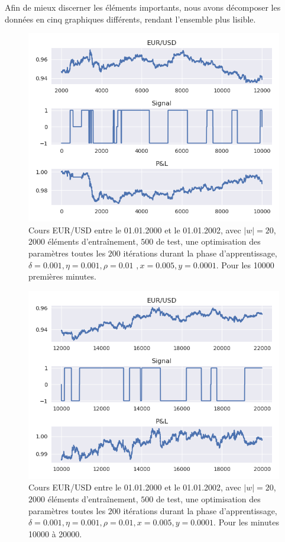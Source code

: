 \documentclass[a4paper, 11pt]{article}
\begin{document}
Afin de mieux discerner les éléments importants, nous avons décomposer les  données en cinq graphiques différents, rendant l'ensemble plus lisible.
 
 \begin{figure}[H]
\centering
\includegraphics[scale=0.85]{images/res/eursud_2000-2001_from_0to_10000}
\caption[Blup]{Cours EUR/USD entre le 01.01.2000 et le 01.01.2002, avec $|w| = 20$, $2000$ éléments d'entraînement, $500$ de test, une optimisation des
paramètres toutes les $200$ itérations durant la phase d'apprentissage, $\delta = 0.001, \eta=0.001,\rho=0.01$
\footnotemark$, x = 0.005, y=0.0001$. Pour les 10000 premières minutes.}
\end{figure}

 \begin{figure}[H]
\centering
\includegraphics[scale=0.85]{images/res/eursud_2000-2001_from_10000to_20000}
\caption[Blup]{Cours EUR/USD entre le 01.01.2000 et le 01.01.2002, avec $|w| = 20$, $2000$ éléments d'entraînement, $500$ de test, une optimisation des
	paramètres toutes les $200$ itérations durant la phase d'apprentissage, $\delta = 0.001, \eta=0.001,\rho=0.01, x = 0.005, y=0.0001$. Pour les minutes 10000 à 20000.}
\end{figure}
\end{document}
